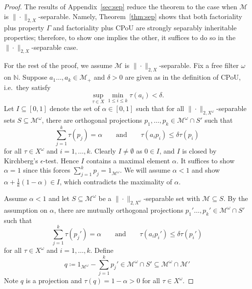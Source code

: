 \documentclass[a4paper,11pt]{amsart}
\theoremstyle{definition}
\numberwithin{equation}{section}
\numberwithin{theorem}{section}
\newcommand{\N}{\mathbb N}
\newcommand{\M}{\mathcal{M}}
\begin{document}
\gammacpou*

\begin{proof}
The results of Appendix~\ref{sec:sep} reduce the theorem to the case when $\M$ is $\|\cdot\|_{2, X}$-separable.  
Namely, Theorem~\ref{thm:sep} shows that both factoriality plus property $\Gamma$ and factoriality plus CPoU are strongly separably inheritable properties;
therefore, to show one implies the other, it suffices to do so in the $\|\cdot\|_{2,X}$-separable case.
	
For the rest of the proof, we assume $\M$ is $\|\cdot\|_{2, X}$-separable. Fix a free filter $\omega$ on $\N$.   
Suppose $a_1 \ldots, a_k \in \M_+$ and $\delta > 0$ are given as in the definition of CPoU, i.e.\ they satisfy
\begin{equation}\label{eq:cpou-proof-setup}
    \sup_{\tau \in X} \min_{1 \leq i \leq k} \tau(a_i) < \delta.
\end{equation}
Let $I \subseteq [0, 1]$ denote the set of $\alpha \in [0, 1]$ such that for all $\|\cdot\|_{2, X^\omega}$-separable sets $S \subseteq \mathcal M^\omega$, there are orthogonal projections $p_1, \ldots, p_k \in \M^\omega \cap S'$ such that 
\begin{equation}
    \sum_{j=1}^k \tau(p_j) = \alpha \qquad \text{and} \qquad \tau(a_i p_i) \leq \delta \tau(p_i)
\end{equation}
for all $\tau \in X^\omega$ and $i = 1, \ldots, k$.  
Clearly $I \neq \emptyset$ as $0 \in I$, and $I$ is closed by Kirchberg's $\epsilon$-test.  
Hence $I$ contains a maximal element $\alpha$.  
It suffices to show $\alpha = 1$ since this forces $\sum_{j=1}^k p_j = 1_\mathcal {M^\omega}$. 
We will assume $\alpha < 1$ and show $\alpha + \frac1k(1 - \alpha) \in I$, which contradicts the maximality of $\alpha$.
	
Assume $\alpha <1$ and let $S \subseteq \M^\omega$ be a $\|\cdot\|_{2, X^\omega}$-separable set with $\M \subseteq S$.  
By the assumption on $\alpha$, there are mutually orthogonal projections $p_1' \ldots, p_k' \in \M^\omega \cap S'$ such that
\begin{equation}
    \sum_{j=1}^k \tau(p_j') = \alpha \qquad \text{and} \qquad \tau(a_i p_i') \leq \delta \tau(p_i')
\end{equation}
for all $\tau \in X^\omega$ and $i = 1, \ldots, k$.  
Define 
\begin{equation}
    q \coloneqq 1_{\M^\omega} - \sum_{j=1}^k p_j' \in \M^\omega \cap S' \subseteq \M^\omega \cap \M'
\end{equation}  
Note $q$ is a projection and $\tau(q) = 1 - \alpha > 0$ for all $\tau \in X^\omega$.
	

\end{proof}
\end{document}
